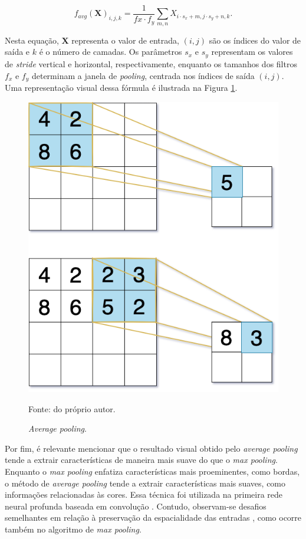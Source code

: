 \begin{equation}
    \label{cnn:eq:pooling:avg_pooling}
    f_{avg}(\boldsymbol{X})_{i, j, k} = \frac{1}{f{x} \cdot f_{y}} \sum_{m, n} X_{i \cdot s_x + m, j \cdot s_{y} + n, k}.
\end{equation}

Nesta equação, $\boldsymbol{X}$ representa o valor de entrada, $(i, j)$ são os índices do valor de saída e $k$ é o número de camadas. Os parâmetros $s_x$ e $s_y$ representam os valores de \textit{stride} vertical e horizontal, respectivamente, enquanto os tamanhos dos filtros $f_x$ e $f_y$ determinam a janela de \textit{pooling}, centrada nos índices de saída $(i,j)$. Uma representação visual dessa fórmula é ilustrada na Figura \ref{cnn:fig:avg_pooling}.

\begin{figure}[H]
    \centering
    \caption{\textit{Average pooling}.}
    \includegraphics[width=0.5\linewidth]{recursos/imagens/deep/avgpooling.png}
    \label{cnn:fig:avg_pooling}

    Fonte: do próprio autor.
\end{figure}

Por fim, é relevante mencionar que o resultado visual obtido pelo \textit{average pooling} tende a extrair características de maneira mais suave do que o \textit{max pooling}. Enquanto o \textit{max pooling} enfatiza características mais proeminentes, como bordas, o método de \textit{average pooling} tende a extrair características mais suaves, como informações relacionadas às cores. Essa técnica foi utilizada na primeira rede neural profunda baseada em convolução \citep{LeCun1998Gradient-basedRecognition}. Contudo, observam-se desafios semelhantes em relação à preservação da espacialidade das entradas \citep{Liu2019Multi-LevelNetworks}, como ocorre também no algoritmo de \textit{max pooling}.

